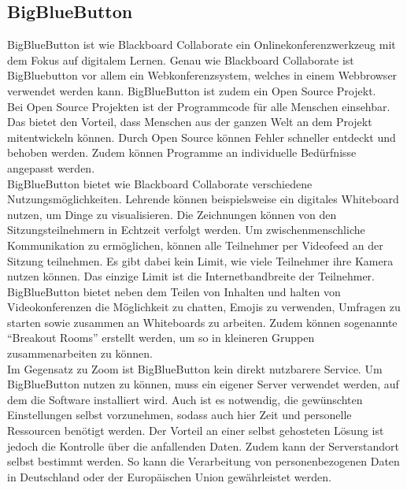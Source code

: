 \subsection{BigBlueButton}
BigBlueButton ist wie Blackboard Collaborate ein Onlinekonferenzwerkzeug mit dem Fokus auf digitalem Lernen.
Genau wie Blackboard Collaborate ist BigBluebutton vor allem ein Webkonferenzsystem, welches in einem Webbrowser verwendet werden kann.
BigBlueButton ist zudem ein Open Source Projekt.
\autocite[Vgl.][]{M_BigBlueButton.o.J.b}
\\
Bei Open Source Projekten ist der Programmcode für alle Menschen einsehbar.
Das bietet den Vorteil, dass Menschen aus der ganzen Welt an dem Projekt mitentwickeln können.
Durch Open Source können Fehler schneller entdeckt und behoben werden.
Zudem können Programme an individuelle Bedürfnisse angepasst werden.
\autocite[Vgl.][]{M_RedHat.o.J.}
\\
BigBlueButton bietet wie Blackboard Collaborate verschiedene Nutzungsmöglichkeiten.
Lehrende können beispielsweise ein digitales Whiteboard nutzen, um Dinge zu visualisieren.
Die Zeichnungen können von den Sitzungsteilnehmern in Echtzeit verfolgt werden.
Um zwischenmenschliche Kommunikation zu ermöglichen, können alle Teilnehmer per Videofeed an der Sitzung teilnehmen.
Es gibt dabei kein Limit, wie viele Teilnehmer ihre Kamera nutzen können.
Das einzige Limit ist die Internetbandbreite der Teilnehmer.
\autocite[Vgl.][]{M_BigBlueButton.o.J.}
\\
BigBlueButton bietet neben dem Teilen von Inhalten und halten von Videokonferenzen die Möglichkeit zu chatten, Emojis zu verwenden, Umfragen zu starten sowie zusammen an Whiteboards zu arbeiten.
Zudem können sogenannte \enquote{Breakout Rooms} erstellt werden, um so in kleineren Gruppen zusammenarbeiten zu können.
\autocite[Vgl.][]{M_BigBlueButton.o.J.}
\\
Im Gegensatz zu Zoom ist BigBlueButton kein direkt nutzbarere Service.
Um BigBlueButton nutzen zu können, muss ein eigener Server verwendet werden, auf dem die Software installiert wird.
Auch ist es notwendig, die gewünschten Einstellungen selbst vorzunehmen, sodass auch hier Zeit und personelle Ressourcen benötigt werden.
Der Vorteil an einer selbst gehosteten Lösung ist jedoch die Kontrolle über die anfallenden Daten.
Zudem kann der Serverstandort selbst bestimmt werden.
So kann die Verarbeitung von personenbezogenen Daten in Deutschland oder der Europäischen Union gewährleistet werden.
\autocite[Vgl.][]{M_Klicksafe.o.J.}

